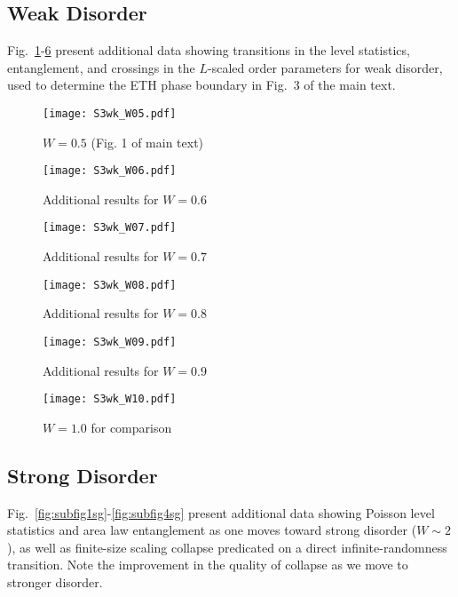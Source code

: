\documentclass[prb,aps, twocolumn, superscriptaddress]{revtex4-1}
\begin{document}
\begin{appendix}
\subsection{Weak Disorder}

Fig.~\ref{fig:subfig2wk}-\ref{fig:subfig7wk} present additional  data showing transitions in the level statistics, entanglement, and crossings in the $L$-scaled order parameters for weak disorder, used to determine the ETH phase boundary in Fig.~3 of the main text.



\begin{figure}[t!]
\caption{$W=0.5$ (Fig. 1 of main text)}{
\texttt{[image: S3wk\_W05.pdf]}
\label{fig:subfig2wk}}
\end{figure}

\begin{figure}[t!]
\caption{Additional results for $W=0.6$}{
\texttt{[image: S3wk\_W06.pdf]}
\label{fig:subfig3wk}}
\end{figure}

\begin{figure}[t!]
\caption{Additional results for $W=0.7$}{
\texttt{[image: S3wk\_W07.pdf]}
\label{fig:subfig4wk}}
\end{figure}

\begin{figure}[t!]
\caption{Additional results for $W=0.8$}{
\texttt{[image: S3wk\_W08.pdf]}
\label{fig:subfig5wk}}
\end{figure}

\begin{figure}[t!]
\caption{Additional results for $W=0.9$}{
\texttt{[image: S3wk\_W09.pdf]}
\label{fig:subfig6wk}}
\end{figure}

\begin{figure}[t!]
\caption{$W=1.0$ for comparison}{
\texttt{[image: S3wk\_W10.pdf]}
\label{fig:subfig7wk}}
\end{figure}

\subsection{Strong Disorder}
Fig.~\ref{fig:subfig1sg}-\ref{fig:subfig4sg} present additional data showing Poisson level statistics and area law entanglement as one moves toward strong disorder ($W \sim 2$), as well as finite-size scaling collapse predicated on a direct infinite-randomness transition.  Note the improvement in the quality of collapse as we move to stronger disorder.



\end{appendix}
\end{document}
